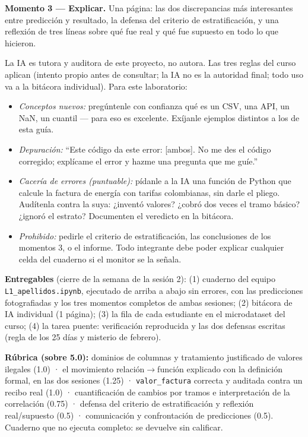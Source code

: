 \documentclass[12pt,letterpaper]{article}
\begin{document}
\textbf{Momento 3 --- Explicar.} Una página: las dos discrepancias más interesantes entre predicción y resultado, la defensa del criterio de estratificación, y una reflexión de tres líneas sobre qué fue real y qué fue supuesto en todo lo que hicieron.

\begin{cajaia}
La IA es tutora y auditora de este proyecto, no autora. Las tres reglas del curso aplican (intento propio antes de consultar; la IA no es la autoridad final; todo uso va a la bitácora individual). Para este laboratorio:
\begin{itemize}[itemsep=0.15em]
    \item \emph{Conceptos nuevos:} pregúntenle con confianza qué es un CSV, una API, un NaN, un cuantil --- para eso es excelente. Exíjanle ejemplos distintos a los de esta guía.
    \item \emph{Depuración:} ``Este código da este error: [ambos]. No me des el código corregido; explícame el error y hazme una pregunta que me guíe.''
    \item \emph{Cacería de errores (puntuable):} pídanle a la IA una función de Python que calcule la factura de energía con tarifas colombianas, sin darle el pliego. Audítenla contra la suya: ¿inventó valores? ¿cobró dos veces el tramo básico? ¿ignoró el estrato? Documenten el veredicto en la bitácora.
    \item \emph{Prohibido:} pedirle el criterio de estratificación, las conclusiones de los momentos 3, o el informe. Todo integrante debe poder explicar cualquier celda del cuaderno si el monitor se la señala.
\end{itemize}
\end{cajaia}

\begin{cajaentrega}
\textbf{Entregables} (cierre de la semana de la sesión 2): (1) cuaderno del equipo \texttt{L1\_apellidos.ipynb}, ejecutado de arriba a abajo sin errores, con las predicciones fotografiadas y los tres momentos completos de ambas sesiones; (2) bitácora de IA individual (1 página); (3) la fila de cada estudiante en el microdataset del curso; (4) la tarea puente: verificación reproducida y las dos defensas escritas (regla de los 25 días y misterio de febrero).

\textbf{Rúbrica (sobre 5.0):} dominios de columnas y tratamiento justificado de valores ilegales (1.0) · el movimiento relación$\to$función explicado con la definición formal, en las dos sesiones (1.25) · \texttt{valor\_factura} correcta y auditada contra un recibo real (1.0) · cuantificación de cambios por tramos e interpretación de la correlación (0.75) · defensa del criterio de estratificación y reflexión real/supuesto (0.5) · comunicación y confrontación de predicciones (0.5). Cuaderno que no ejecuta completo: se devuelve sin calificar.
\end{cajaentrega}
\end{document}
